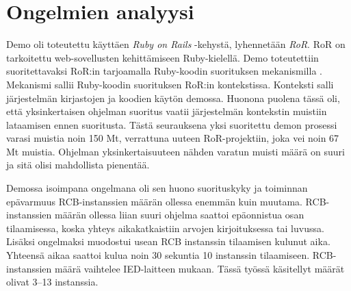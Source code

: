 \section{Ongelmien analyysi}
Demo oli toteutettu käyttäen \emph{Ruby on Rails} -kehystä, lyhennetään \emph{RoR}. RoR on tarkoitettu web-sovellusten kehittämiseen Ruby-kielellä. Demo toteutettiin suoritettavaksi RoR:in tarjoamalla Ruby-koodin suorituksen mekanismilla \cite{rails-runner}. Mekanismi sallii Ruby-koodin suorituksen RoR:in kontekstissa. Konteksti salli järjestelmän kirjastojen ja koodien käytön demossa. Huonona puolena tässä oli, että yksinkertaisen ohjelman suoritus vaatii järjestelmän kontekstin muistiin lataamisen ennen suoritusta. Tästä seurauksena yksi suoritettu demon prosessi varasi muistia noin 150 Mt, verrattuna uuteen RoR-projektiin, joka vei noin 67 Mt muistia. Ohjelman yksinkertaisuuteen nähden varatun muisti määrä on suuri ja sitä olisi mahdollista pienentää.

Demossa isoimpana ongelmana oli sen huono suorituskyky ja toiminnan epävarmuus RCB-instanssien määrän ollessa enemmän kuin muutama. RCB-instanssien määrän ollessa liian suuri ohjelma saattoi epäonnistua osan tilaamisessa, koska yhteys aikakatkaistiin arvojen kirjoituksessa tai luvussa. Lisäksi ongelmaksi muodostui usean RCB instanssin tilaamisen kulunut aika. Yhteensä aikaa saattoi kulua noin 30 sekuntia 10 instanssin tilaamiseen. RCB-instanssien määrä vaihtelee IED-laitteen mukaan. Tässä työssä käsitellyt määrät olivat 3--13 instanssia.

